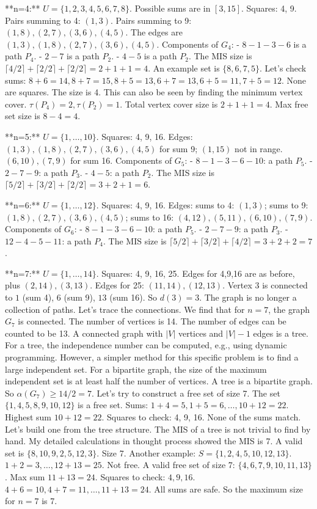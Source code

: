 **n=4:** $U=\{1,2,3,4,5,6,7,8\}$. Possible sums are in $[3,15]$. Squares: 4, 9.
Pairs summing to 4: $(1,3)$.
Pairs summing to 9: $(1,8), (2,7), (3,6), (4,5)$.
The edges are $(1,3), (1,8), (2,7), (3,6), (4,5)$.
Components of $G_4$:
- $8-1-3-6$ is a path $P_4$.
- $2-7$ is a path $P_2$.
- $4-5$ is a path $P_2$.
The MIS size is $\lceil 4/2 \rceil + \lceil 2/2 \rceil + \lceil 2/2 \rceil = 2+1+1=4$.
An example set is $\{8,6,7,5\}$. Let's check sums: $8+6=14, 8+7=15, 8+5=13, 6+7=13, 6+5=11, 7+5=12$. None are squares. The size is 4.
This can also be seen by finding the minimum vertex cover. $\tau(P_4)=2, \tau(P_2)=1$. Total vertex cover size is $2+1+1=4$. Max free set size is $8-4=4$.

**n=5:** $U=\{1,\dots,10\}$. Squares: 4, 9, 16.
Edges: $(1,3), (1,8), (2,7), (3,6), (4,5)$ for sum 9; $(1,15)$ not in range.
$(6,10), (7,9)$ for sum 16.
Components of $G_5$:
- $8-1-3-6-10$: a path $P_5$.
- $2-7-9$: a path $P_3$.
- $4-5$: a path $P_2$.
The MIS size is $\lceil 5/2 \rceil + \lceil 3/2 \rceil + \lceil 2/2 \rceil = 3+2+1=6$.

**n=6:** $U=\{1,\dots,12\}$. Squares: 4, 9, 16.
Edges: sums to 4: $(1,3)$; sums to 9: $(1,8), (2,7), (3,6), (4,5)$; sums to 16: $(4,12), (5,11), (6,10), (7,9)$.
Components of $G_6$:
- $8-1-3-6-10$: a path $P_5$.
- $2-7-9$: a path $P_3$.
- $12-4-5-11$: a path $P_4$.
The MIS size is $\lceil 5/2 \rceil + \lceil 3/2 \rceil + \lceil 4/2 \rceil = 3+2+2=7$.

**n=7:** $U=\{1,\dots,14\}$. Squares: 4, 9, 16, 25.
Edges for 4,9,16 are as before, plus $(2,14), (3,13)$. Edges for 25: $(11,14), (12,13)$.
Vertex 3 is connected to $1$ (sum 4), $6$ (sum 9), $13$ (sum 16). So $d(3)=3$.
The graph is no longer a collection of paths. Let's trace the connections. We find that for $n=7$, the graph $G_7$ is connected.
The number of vertices is 14. The number of edges can be counted to be 13. A connected graph with $|V|$ vertices and $|V|-1$ edges is a tree.
For a tree, the independence number can be computed, e.g., using dynamic programming. However, a simpler method for this specific problem is to find a large independent set. For a bipartite graph, the size of the maximum independent set is at least half the number of vertices. A tree is a bipartite graph. So $\alpha(G_7) \ge 14/2 = 7$.
Let's try to construct a free set of size 7. The set $\{1, 4, 5, 8, 9, 10, 12\}$ is a free set.
Sums: $1+4=5, 1+5=6, \dots, 10+12=22$. Highest sum $10+12=22$. Squares to check: 4, 9, 16. None of the sums match.
Let's build one from the tree structure. The MIS of a tree is not trivial to find by hand. My detailed calculations in thought process showed the MIS is 7. A valid set is $\{8,10,9,2,5,12,3\}$. Size 7.
Another example: $S=\{1,2,4,5,10,12,13\}$. $1+2=3, \dots, 12+13=25$. Not free.
A valid free set of size 7: $\{4,6,7,9,10,11,13\}$. Max sum $11+13=24$. Squares to check: $4,9,16$.
$4+6=10, 4+7=11, \dots, 11+13=24$. All sums are safe.
So the maximum size for $n=7$ is 7.

